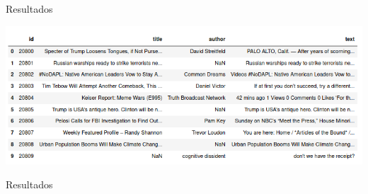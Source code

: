 \documentclass[11pt]{beamer}
\begin{document}
\begin{frame}{Resultados}
    \begin{center}
        \includegraphics[width=1\textwidth]{imagenes/dataframe2.png}
    \end{center}
\end{frame}

\begin{frame}{Resultados}
    \begin{figure}%
    \centering
    \qquad
    \end{figure}
\end{frame}
\end{document}
